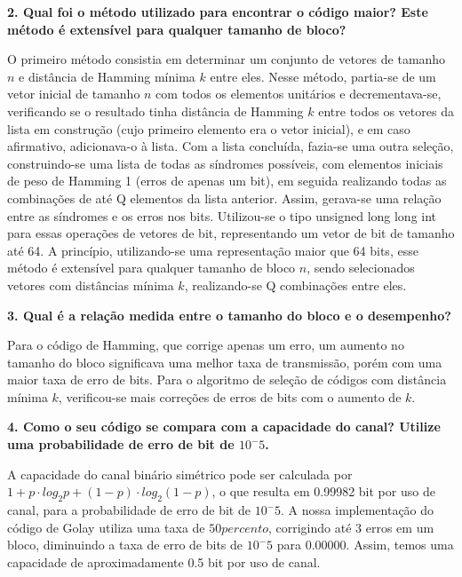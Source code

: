 \documentclass[%
aip,
jmp,%
amsmath,amssymb,
reprint,%
]{revtex4-1}
\begin{document}
	
	\textbf{2. Qual foi o método utilizado para encontrar o código maior? Este método é extensível para qualquer tamanho de bloco?}\newline
	
	O primeiro método consistia em determinar um conjunto de vetores de tamanho $n$ e distância de Hamming mínima $k$ entre eles. Nesse método, partia-se de um vetor inicial de tamanho $n$ com todos os elementos unitários e decrementava-se, verificando se o resultado tinha distância de Hamming $k$ entre todos os vetores da lista em construção (cujo primeiro elemento era o vetor inicial), e em caso afirmativo, adicionava-o à lista. Com a lista concluída, fazia-se uma outra seleção, construindo-se uma lista de todas as síndromes possíveis, com elementos iniciais de peso de Hamming 1 (erros de apenas um bit), em seguida realizando todas as combinações de até Q elementos da lista anterior. Assim, gerava-se uma relação entre as síndromes e os erros nos bits. 
	Utilizou-se o tipo unsigned long long int para essas operações de vetores de bit, representando um vetor de bit de tamanho até 64. A princípio, utilizando-se uma representação maior que 64 bits, esse método é extensível para qualquer tamanho de bloco $n$, sendo selecionados vetores com distâncias mínima $k$, realizando-se Q combinações entre eles. 
	\newline
	
	\textbf{3. Qual é a relação medida entre o tamanho do bloco e o desempenho?}\newline
	
	Para o código de Hamming, que corrige apenas um erro, um aumento no tamanho do bloco significava uma melhor taxa de transmissão, porém com uma maior taxa de erro de bits.
	Para o algoritmo de seleção de códigos com distância mínima $k$, verificou-se mais correções de erros de bits com o aumento de $k$.
	\newline
	
	\textbf{4. Como o seu código se compara com a capacidade do canal? Utilize uma probabilidade de erro de bit de $10^-5$.}\newline
	
	A capacidade do canal binário simétrico pode ser calculada por $1 + p\cdot log_{2}p  + (1-p)\cdot log_{2}(1-p)$, o que resulta em 0.99982 bit por uso de canal, para a probabilidade de erro de bit de $10^-5$. A nossa implementação do código de Golay utiliza uma taxa de $50 percento$, corrigindo até 3 erros em um bloco, diminuindo a taxa de erro de bits de $10^-5$ para $0.00000$. Assim, temos uma capacidade de aproximadamente 0.5 bit por uso de canal.
	\newline
	
\end{document}
